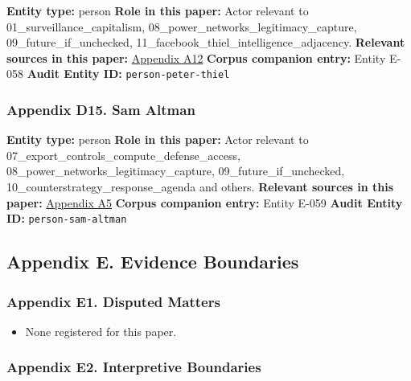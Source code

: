 \documentclass[
  american,
  11pt,
  letterpaper,
]{article}
\providecommand{\tightlist}{%
  \setlength{\itemsep}{0pt}\setlength{\parskip}{0pt}}
\begin{document}
\textbf{Entity type:} person \textbf{Role in this paper:} Actor relevant
to 01\_surveillance\_capitalism,
08\_power\_networks\_legitimacy\_capture, 09\_future\_if\_unchecked,
11\_facebook\_thiel\_intelligence\_adjacency. \textbf{Relevant sources
in this paper:}
\hyperref[appendix-a12-meta-platforms-inc-2022-definitive-proxy-statement]{Appendix
A12} \textbf{Corpus companion entry:} Entity E-058 \textbf{Audit Entity
ID:} \texttt{person-peter-thiel}

\subsubsection{Appendix D15. Sam Altman}\label{appendix-d15-sam-altman}

\textbf{Entity type:} person \textbf{Role in this paper:} Actor relevant
to 07\_export\_controls\_compute\_defense\_access,
08\_power\_networks\_legitimacy\_capture, 09\_future\_if\_unchecked,
10\_counterstrategy\_response\_agenda and others. \textbf{Relevant
sources in this paper:}
\hyperref[appendix-a5-openais-proposals-for-the-us-ai-action-plan]{Appendix
A5} \textbf{Corpus companion entry:} Entity E-059 \textbf{Audit Entity
ID:} \texttt{person-sam-altman}

\subsection{Appendix E. Evidence
Boundaries}\label{appendix-e.-evidence-boundaries}

\subsubsection{Appendix E1. Disputed
Matters}\label{appendix-e1-disputed-matters}

\begin{itemize}
\tightlist
\item
  None registered for this paper.
\end{itemize}

\subsubsection{Appendix E2. Interpretive
Boundaries}\label{appendix-e2-interpretive-boundaries}
\end{document}
